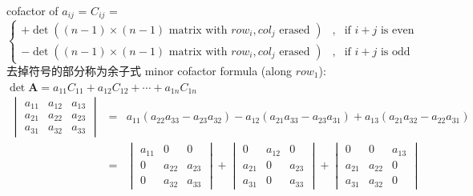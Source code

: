\documentclass[12pt, a4paper]{article}
\begin{document}
{\newline
cofactor of $a_{ij}$ = $C_{ij}$ = 
\begin{math}
	\left\{
	\begin{array}{rcl}
		+ \det{\left( (n-1)\times(n-1){\text{ matrix with }} row_i, col_j {\text{ erased }} \right)} & , & {\text{if }} i+j {\text{ is even}} \\
		- \det{\left( (n-1)\times(n-1){\text{ matrix with }} row_i, col_j {\text{ erased }} \right)} & , & {\text{if }} i+j {\text{ is odd}}
	\end{array}
	\right.
\end{math}
\newline
{\textcolor{anhao-scarlet}{去掉符号的部分称为余子式 minor}}
\vspace{14pt}
\newline
cofactor formula (along $row_1$): $\det{\mathbf{A}} = a_{11}C_{11} + a_{12}C_{12} + \cdots + a_{1n}C_{1n}$
\vspace{31pt}
\newline
\begin{math}
	\begin{array}{rcl}
		\begin{vmatrix}
			a_{11} & a_{12} & a_{13} \\
			a_{21} & a_{22} & a_{23} \\
			a_{31} & a_{32} & a_{33} 
		\end{vmatrix}
		& = &
		a_{11}\left(a_{22}a_{33}-a_{23}a_{32}\right) - a_{12}\left(a_{21}a_{33}-a_{23}a_{31}\right) + 
		a_{13}\left(a_{21}a_{32}-a_{22}a_{31}\right) 
		\\
		& = &
		\begin{vmatrix}
			a_{11} & 0 & 0 \\
			0 & a_{22} & a_{23} \\
			0 & a_{32} & a_{33} 
		\end{vmatrix}
		 + 
		\begin{vmatrix}
			0 & a_{12} & 0 \\
			a_{21} & 0 & a_{23} \\
			a_{31} & 0 & a_{33} 
		\end{vmatrix}
		 + 
		\begin{vmatrix}
			0 & 0 & a_{13} \\
			a_{21} & a_{22} & 0 \\
			a_{31} & a_{32} & 0 
		\end{vmatrix}
	\end{array}
\end{math}
\vspace{31pt}
}
\end{document}
